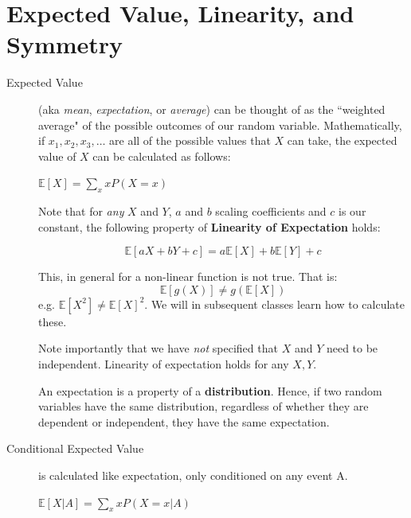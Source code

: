 \documentclass[11pt]{article}
\theoremstyle{definition}
\theoremstyle{remark}
\newcommand{\E}[1]{\mathbb{E}\left[ #1 \right]}
\begin{document}
\section{Expected Value, Linearity, and Symmetry}
\begin{description}
\item[Expected Value] (aka \emph{mean}, \emph{expectation}, or \emph{average}) can be thought of as the ``weighted average" of the possible outcomes of our random variable. Mathematically, if $x_1, x_2, x_3, \dots$ are all of the possible values that $X$ can take, the expected value of $X$ can be calculated as follows:
\begin{center}
$\E{X} = \sum\limits_{x} x P(X=x)$
\end{center}
Note that for \emph{any} $X$ and $Y$, $a$ and $b$ scaling coefficients and $c$ is our constant, the following property of \textbf{Linearity of Expectation} holds:

\[ \E{aX + bY + c} = a\E{X} + b\E{Y} + c \]

\Biohazard This, in general for a non-linear function is not true. That is: $$\E{g(X)} \neq g(\E{X})$$ e.g. $\E{X^2} \neq \E{X}^2$. We will in subsequent classes learn how to calculate these.

\Biohazard Note importantly that we have \textit{not} specified that $X$ and $Y$ need to be independent. Linearity of expectation holds for any $X,Y$.

\Biohazard An expectation is a property of a \textbf{distribution}. Hence, if two random variables have the same distribution, regardless of whether they are dependent or independent, they have the same expectation.

\item[Conditional Expected Value] is calculated like expectation, only conditioned on any event A. \begin{center}
$\E{X | A} = \sum\limits_{x}xP(X=x | A)$
\end{center}

\end{description}
\end{document}
